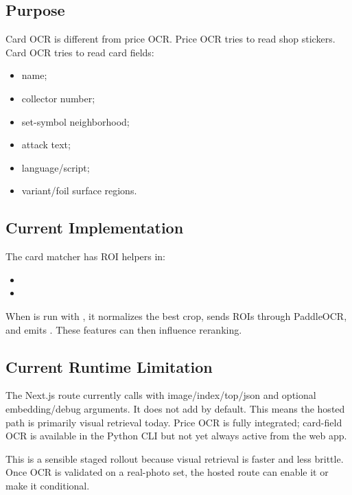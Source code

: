 \documentclass[11pt,a4paper]{article}
\begin{document}
\subsection{Purpose}

Card OCR is different from price OCR. Price OCR tries to read shop stickers. Card OCR tries to read card fields:

\begin{itemize}
  \item name;
  \item collector number;
  \item set-symbol neighborhood;
  \item attack text;
  \item language/script;
  \item variant/foil surface regions.
\end{itemize}

\subsection{Current Implementation}

The card matcher has ROI helpers in:

\begin{itemize}
  \item {}
  \item {}
\end{itemize}

When  is run with , it normalizes the best crop, sends ROIs through PaddleOCR, and emits . These features can then influence reranking.

\subsection{Current Runtime Limitation}

The Next.js route currently calls  with image/index/top/json and optional embedding/debug arguments. It does not add  by default. This means the hosted path is primarily visual retrieval today. Price OCR is fully integrated; card-field OCR is available in the Python CLI but not yet always active from the web app.

This is a sensible staged rollout because visual retrieval is faster and less brittle. Once OCR is validated on a real-photo set, the hosted route can enable it or make it conditional.
\end{document}
